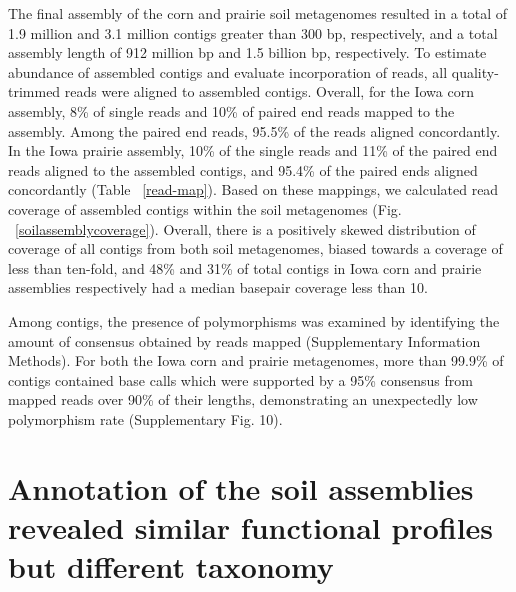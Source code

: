 \documentclass{nature}%
\begin{document}
The final assembly of the corn and prairie soil metagenomes resulted
in a total of 1.9 million and 3.1 million contigs greater than 300 bp,
respectively, and a total assembly length of 912 million bp and 1.5
billion bp, respectively.  To estimate abundance of assembled contigs
and evaluate incorporation of reads, all quality-trimmed reads were
aligned to assembled contigs.  Overall, for the Iowa corn assembly,
8\% of single reads and 10\% of paired end reads mapped to the
assembly.  Among the paired end reads, 95.5\% of the reads aligned
concordantly.  In the Iowa prairie assembly, 10\% of the single reads
and 11\% of the paired end reads aligned to the assembled contigs, and
95.4\% of the paired ends aligned concordantly (Table
~\ref{read-map}).  Based on these mappings, we calculated read
coverage of assembled contigs within the soil metagenomes
(Fig. ~\ref{soilassemblycoverage}).  Overall, there is a positively
skewed distribution of coverage of all contigs from both soil
metagenomes, biased towards a coverage of less than ten-fold, and 48\%
and 31\% of total contigs in Iowa corn and prairie assemblies
respectively had a median basepair coverage less than 10.

Among contigs, the presence of polymorphisms was examined by
identifying the amount of consensus obtained by reads mapped
(Supplementary Information Methods).  For both the Iowa corn and prairie metagenomes,
more than 99.9\% of contigs contained base calls which were supported
by a 95\% consensus from mapped reads over 90\% of their lengths,
demonstrating an unexpectedly low polymorphism rate
(Supplementary Fig. 10).
 

\section*{Annotation of the soil assemblies revealed similar functional
profiles but different taxonomy}
 
\end{document}
